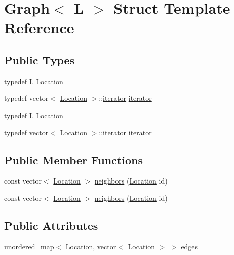 \hypertarget{structGraph}{}\section{Graph$<$ L $>$ Struct Template Reference}
\label{structGraph}
\subsection*{Public Types}
\begin{DoxyCompactItemize}
\item 
typedef L \mbox{\hyperlink{structGraph_aea7d42bb67163fe692353674435a1426}{Location}}
\item 
typedef vector$<$ \mbox{\hyperlink{structGraph_aea7d42bb67163fe692353674435a1426}{Location}} $>$\+::\mbox{\hyperlink{structGraph_af43d6412d7a6034eaeacde8ca1c1d984}{iterator}} \mbox{\hyperlink{structGraph_af43d6412d7a6034eaeacde8ca1c1d984}{iterator}}
\item 
typedef L \mbox{\hyperlink{structGraph_aea7d42bb67163fe692353674435a1426}{Location}}
\item 
typedef vector$<$ \mbox{\hyperlink{structGraph_aea7d42bb67163fe692353674435a1426}{Location}} $>$\+::\mbox{\hyperlink{structGraph_af43d6412d7a6034eaeacde8ca1c1d984}{iterator}} \mbox{\hyperlink{structGraph_af43d6412d7a6034eaeacde8ca1c1d984}{iterator}}
\end{DoxyCompactItemize}
\subsection*{Public Member Functions}
\begin{DoxyCompactItemize}
\item 
const vector$<$ \mbox{\hyperlink{structGraph_aea7d42bb67163fe692353674435a1426}{Location}} $>$ \mbox{\hyperlink{structGraph_a8389c308ee673e63d574e0a30191662e}{neighbors}} (\mbox{\hyperlink{structGraph_aea7d42bb67163fe692353674435a1426}{Location}} id)
\item 
const vector$<$ \mbox{\hyperlink{structGraph_aea7d42bb67163fe692353674435a1426}{Location}} $>$ \mbox{\hyperlink{structGraph_a8389c308ee673e63d574e0a30191662e}{neighbors}} (\mbox{\hyperlink{structGraph_aea7d42bb67163fe692353674435a1426}{Location}} id)
\end{DoxyCompactItemize}
\subsection*{Public Attributes}
\begin{DoxyCompactItemize}
\item 
unordered\+\_\+map$<$ \mbox{\hyperlink{structGraph_aea7d42bb67163fe692353674435a1426}{Location}}, vector$<$ \mbox{\hyperlink{structGraph_aea7d42bb67163fe692353674435a1426}{Location}} $>$ $>$ \mbox{\hyperlink{structGraph_a8b01818e086835dc5d24ec4082afeef0}{edges}}
\end{DoxyCompactItemize}


